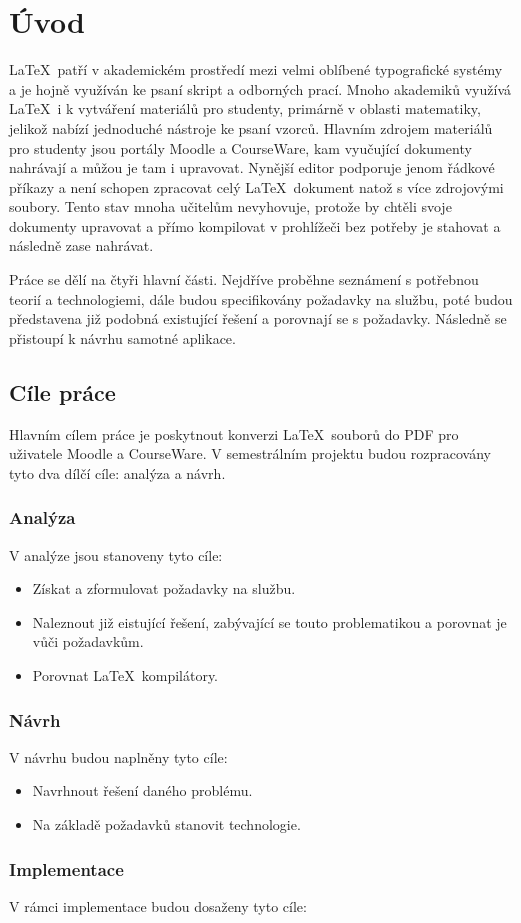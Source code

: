 \chapter{Úvod}
\LaTeX\ patří v akademickém prostředí mezi velmi oblíbené typografické systémy a je hojně využíván ke psaní skript a odborných prací. Mnoho akademiků využívá \LaTeX\ i k vytváření materiálů pro studenty, primárně v oblasti matematiky, jelikož nabízí jednoduché nástroje ke psaní vzorců. Hlavním zdrojem materiálů pro studenty jsou portály Moodle a CourseWare, kam vyučující dokumenty nahrávají a můžou je tam i upravovat. Nynější editor podporuje jenom řádkové příkazy a není schopen zpracovat celý \LaTeX\ dokument natož s více zdrojovými soubory. Tento stav mnoha učitelům nevyhovuje, protože by chtěli svoje dokumenty upravovat a přímo kompilovat v prohlížeči bez potřeby je stahovat a následně zase nahrávat. 

Práce se dělí na čtyři hlavní části. Nejdříve proběhne seznámení s potřebnou teorií a technologiemi, dále budou specifikovány požadavky na službu, poté budou představena již podobná existující řešení a porovnají se s požadavky. Následně se přistoupí k návrhu samotné aplikace.


\section{Cíle práce}
Hlavním cílem práce je poskytnout konverzi \LaTeX\ souborů do PDF pro uživatele Moodle a CourseWare. V semestrálním projektu budou rozpracovány tyto dva dílčí cíle: analýza a návrh.

\subsection{Analýza} 
V analýze jsou stanoveny tyto cíle:

\begin{itemize}
	\item Získat a zformulovat požadavky na službu.
	\item Naleznout již eistující řešení, zabývající se touto problematikou a porovnat je vůči požadavkům.
	\item Porovnat \LaTeX\ kompilátory. 
\end{itemize}
\newpage
\subsection{Návrh}
V návrhu budou naplněny tyto cíle:

\begin{itemize}
	\item Navrhnout řešení daného problému. 
	\item Na základě požadavků stanovit technologie.
\end{itemize}

\subsection{Implementace}
V rámci implementace budou dosaženy tyto cíle:




